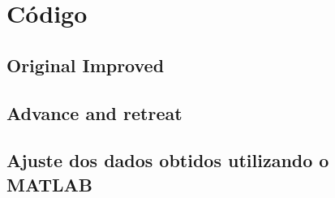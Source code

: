 \documentclass[portuguese,11pt,a4paper,titlepage]{article}
\newcommand{\srcdir}{..}
\newcommand{\matlabdir}{"../MATLAB fittings"}
\begin{document}
\section{Código}
\subsection{Original Improved}

\pagebreak
\subsection{Advance and retreat}

\subsection{Ajuste dos dados obtidos utilizando o MATLAB}

\end{document}
